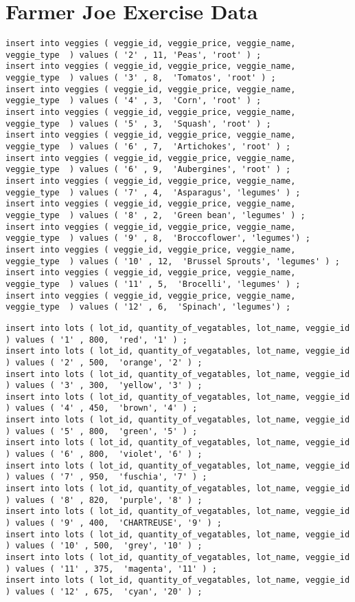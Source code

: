 \section {Farmer Joe Exercise Data}

\begin{verbatim}
insert into veggies ( veggie_id, veggie_price, veggie_name, veggie_type  ) values ( '2' , 11, 'Peas', 'root' ) ;
insert into veggies ( veggie_id, veggie_price, veggie_name, veggie_type  ) values ( '3' , 8,  'Tomatos', 'root' ) ;
insert into veggies ( veggie_id, veggie_price, veggie_name, veggie_type  ) values ( '4' , 3,  'Corn', 'root' ) ;
insert into veggies ( veggie_id, veggie_price, veggie_name, veggie_type  ) values ( '5' , 3,  'Squash', 'root' ) ;
insert into veggies ( veggie_id, veggie_price, veggie_name, veggie_type  ) values ( '6' , 7,  'Artichokes', 'root' ) ;
insert into veggies ( veggie_id, veggie_price, veggie_name, veggie_type  ) values ( '6' , 9,  'Aubergines', 'root' ) ;
insert into veggies ( veggie_id, veggie_price, veggie_name, veggie_type  ) values ( '7' , 4,  'Asparagus', 'legumes' ) ;
insert into veggies ( veggie_id, veggie_price, veggie_name, veggie_type  ) values ( '8' , 2,  'Green bean', 'legumes' ) ;
insert into veggies ( veggie_id, veggie_price, veggie_name, veggie_type  ) values ( '9' , 8,  'Broccoflower', 'legumes') ;
insert into veggies ( veggie_id, veggie_price, veggie_name, veggie_type  ) values ( '10' , 12,  'Brussel Sprouts', 'legumes' ) ;
insert into veggies ( veggie_id, veggie_price, veggie_name, veggie_type  ) values ( '11' , 5,  'Brocelli', 'legumes' ) ;
insert into veggies ( veggie_id, veggie_price, veggie_name, veggie_type  ) values ( '12' , 6,  'Spinach', 'legumes') ;
\end{verbatim}

\begin{verbatim}
insert into lots ( lot_id, quantity_of_vegatables, lot_name, veggie_id ) values ( '1' , 800,  'red', '1' ) ; 
insert into lots ( lot_id, quantity_of_vegatables, lot_name, veggie_id ) values ( '2' , 500,  'orange', '2' ) ; 
insert into lots ( lot_id, quantity_of_vegatables, lot_name, veggie_id ) values ( '3' , 300,  'yellow', '3' ) ; 
insert into lots ( lot_id, quantity_of_vegatables, lot_name, veggie_id ) values ( '4' , 450,  'brown', '4' ) ; 
insert into lots ( lot_id, quantity_of_vegatables, lot_name, veggie_id ) values ( '5' , 800,  'green', '5' ) ; 
insert into lots ( lot_id, quantity_of_vegatables, lot_name, veggie_id ) values ( '6' , 800,  'violet', '6' ) ; 
insert into lots ( lot_id, quantity_of_vegatables, lot_name, veggie_id ) values ( '7' , 950,  'fuschia', '7' ) ; 
insert into lots ( lot_id, quantity_of_vegatables, lot_name, veggie_id ) values ( '8' , 820,  'purple', '8' ) ; 
insert into lots ( lot_id, quantity_of_vegatables, lot_name, veggie_id ) values ( '9' , 400,  'CHARTREUSE', '9' ) ; 
insert into lots ( lot_id, quantity_of_vegatables, lot_name, veggie_id ) values ( '10' , 500,  'grey', '10' ) ; 
insert into lots ( lot_id, quantity_of_vegatables, lot_name, veggie_id ) values ( '11' , 375,  'magenta', '11' ) ; 
insert into lots ( lot_id, quantity_of_vegatables, lot_name, veggie_id ) values ( '12' , 675,  'cyan', '20' ) ; 
\end{verbatim}